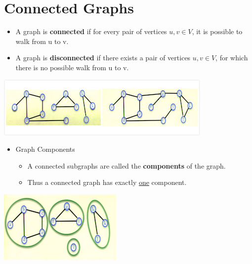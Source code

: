 \documentclass[12pt]{article}
\begin{document}
\section{Connected Graphs}
\renewcommand{\labelitemii}{$\circ$}
\renewcommand{\labelitemiii}{$\cdot$}
\renewcommand{\labelitemiii}{$\rightarrow$}
\renewcommand{\labelitemiv}{$\star$}
\begin{itemize}
\item A graph is \textbf{connected} if for every pair of vertices $u, v \in V$, it is possible to walk from u to v.
\item A graph is \textbf{disconnected} if there exists a pair of vertices $u, v \in V$, for which there is no possible walk from u to v.
\end{itemize}
\begin{center}
\includegraphics{lecture711}
\end{center}
\begin{itemize}
\item Graph Components
	\begin{itemize}
	\item A connected subgraphs are called the \textbf{components} of the graph.
	\item Thus a connected graph has exactly \underline{one} component.
	\end{itemize}
\end{itemize}
\begin{center}
\includegraphics{lecture712}
\end{center}
\end{document}

